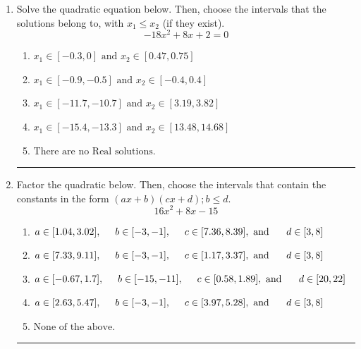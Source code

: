 \documentclass[14pt]{extbook}
\newcommand{\litem}[1]{\item#1\hspace*{-1cm}\rule{\textwidth}{0.4pt}}
\begin{document}
\begin{enumerate}
{\begin{enumerate}[label=\Alph*.]
\end{enumerate} }
\litem{
Solve the quadratic equation below. Then, choose the intervals that the solutions belong to, with $x_1 \leq x_2$ (if they exist).\[ -18x^{2} +8 x + 2 = 0 \]\begin{enumerate}[label=\Alph*.]
\item \( x_1 \in [-0.3, 0] \text{ and } x_2 \in [0.47, 0.75] \)
\item \( x_1 \in [-0.9, -0.5] \text{ and } x_2 \in [-0.4, 0.4] \)
\item \( x_1 \in [-11.7, -10.7] \text{ and } x_2 \in [3.19, 3.82] \)
\item \( x_1 \in [-15.4, -13.3] \text{ and } x_2 \in [13.48, 14.68] \)
\item \( \text{There are no Real solutions.} \)

\end{enumerate} }
\litem{
Factor the quadratic below. Then, choose the intervals that contain the constants in the form $(ax+b)(cx+d); b \leq d.$\[ 16x^{2} +8 x -15 \]\begin{enumerate}[label=\Alph*.]
\item \( a \in [1.04, 3.02], \hspace*{5mm} b \in [-3, -1], \hspace*{5mm} c \in [7.36, 8.39], \text{ and } \hspace*{5mm} d \in [3, 8] \)
\item \( a \in [7.33, 9.11], \hspace*{5mm} b \in [-3, -1], \hspace*{5mm} c \in [1.17, 3.37], \text{ and } \hspace*{5mm} d \in [3, 8] \)
\item \( a \in [-0.67, 1.7], \hspace*{5mm} b \in [-15, -11], \hspace*{5mm} c \in [0.58, 1.89], \text{ and } \hspace*{5mm} d \in [20, 22] \)
\item \( a \in [2.63, 5.47], \hspace*{5mm} b \in [-3, -1], \hspace*{5mm} c \in [3.97, 5.28], \text{ and } \hspace*{5mm} d \in [3, 8] \)
\item \( \text{None of the above.} \)


\end{enumerate}}
\end{enumerate}
\end{document}
